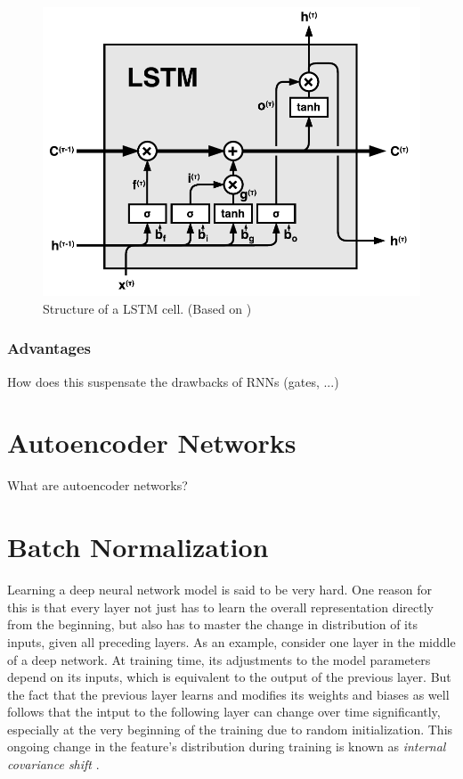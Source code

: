 \begin{figure}[htpb]
	\centering
	\includegraphics[scale=0.8]{figures/lstm.pdf}
	\caption[Structure of a LSLTM cell]{Structure of a LSTM cell. (Based on \parencite{understand_lstm})} \label{fig:cnn-structure}
\end{figure}


\subsubsection{Advantages}
How does this suspensate the drawbacks of RNNs (gates, ...)

\section{Autoencoder Networks} \label{sec:autoencoder}

What are autoencoder networks?


\section{Batch Normalization}

Learning a deep neural network model is said to be very hard. One reason for this is that every layer not just has to learn the overall representation directly from the beginning, but also has to master the change in distribution of its inputs, given all preceding layers. As an example, consider one layer in the middle of a deep network. At training time, its adjustments to the model parameters depend on its inputs, which is equivalent to the output of the previous layer. But the fact that the previous layer learns and modifies its weights and biases as well follows that the intput to the following layer can change over time significantly, especially at the very beginning of the training due to random initialization. This ongoing change in the feature's distribution during training is known as \textit{internal covariance shift} \parencite{rnn-batchnorm}.

